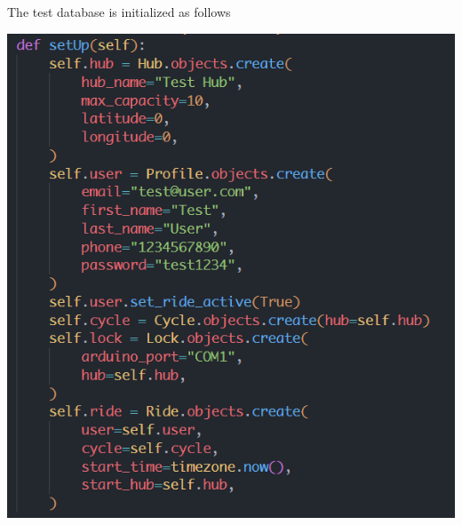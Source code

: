 \documentclass[11pt]{article}
\begin{document}
The test database is initialized as follows
\begin{center}
    \includegraphics[scale=0.6]{unit_testing_codes/end_ride_setup.png}
\end{center}
\end{document}
